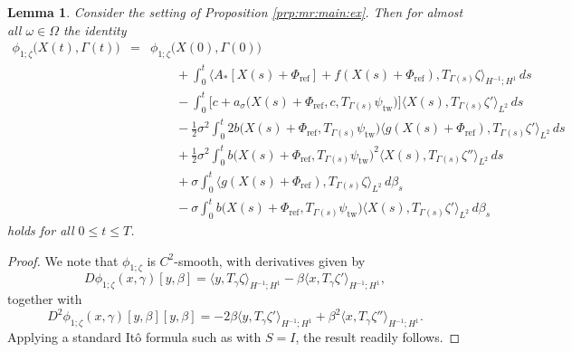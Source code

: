 \documentclass[10pt]{articleHJ}
\newtheorem{lem}[thm]{Lemma}
\numberwithin{equation}{section}
\begin{document}
\begin{lem}
Consider the setting
of Proposition
\ref{prp:mr:main:ex}.
Then for almost all $\omega \in \Omega$
the identity
\begin{equation}
\label{eq:sps:ito:i}
\begin{array}{lcl}
\phi_{1;\zeta}\big(X(t), \Gamma(t) \big)
 & = & \phi_{1;\zeta}\big( X(0), \Gamma(0) \big)
\\[0.2cm]
& & \qquad
  + \int_0^t
  \langle A_* [X(s) + \Phi_{\mathrm{ref}} ]  + f(X(s) + \Phi_{\mathrm{ref}}),
    T_{\Gamma(s)} \zeta \rangle_{H^{-1}; H^1} \, ds
\\[0.2cm]
& & \qquad
  - \int_0^t
  \big[
    c + a_{\sigma}\big( X(s) + \Phi_{\mathrm{ref}},c, T_{\Gamma(s)} \psi_{\mathrm{tw}} \big)
  \big]
    \langle X(s) , T_{\Gamma(s)} \zeta'
       \rangle_{L^2} \, d s
\\[0.2cm]
& & \qquad
- \frac{1}{2} \sigma^2
\int_0^t
2 b\big(X(s) + \Phi_{\mathrm{ref}}, T_{\Gamma(s)} \psi_{\mathrm{tw}} \big)
  \langle g(X(s) + \Phi_{\mathrm{ref}}) , T_{\Gamma(s)} \zeta' \rangle_{L^2}
  \, d s
\\[0.2cm]
& & \qquad
  + \frac{1}{2} \sigma^2 \int_0^t
     b\big(X(s) + \Phi_{\mathrm{ref}}, T_{\Gamma(s)} \psi_{\mathrm{tw}} \big)^2
   \langle X(s) , T_{\Gamma(s)} \zeta'' \rangle_{L^2}
    \, d s
\\[0.2cm]
& & \qquad
+ \sigma \int_0^t
  \langle g(X(s) + \Phi_{\mathrm{ref}}) , T_{\Gamma(s)} \zeta \rangle_{L^2} \, d \beta_s
\\[0.2cm]
& & \qquad
  - \sigma \int_0^t
   b\big( X(s) + \Phi_{\mathrm{ref}}  , T_{\Gamma(s)} \psi_{\mathrm{tw}} \big)
    \langle X(s) , T_{\Gamma(s)} \zeta'
       \rangle_{L^2} \, d \beta_s
\end{array}
\end{equation}
holds for all $0 \le t \le T$.
\end{lem}
\begin{proof}
We note that $\phi_{1;\zeta}$ is $C^2$-smooth,
with derivatives given by
\begin{equation}
D \phi_{1;\zeta}(x, \gamma)[y, \beta]
 = \langle y , T_{\gamma} \zeta \rangle_{H^{-1}; H^1}
  - \beta \langle x , T_{\gamma} \zeta'  \rangle_{H^{-1}; H^1} ,
\end{equation}
together with
\begin{equation}
D^2 \phi_{1;\zeta}(x, \gamma)[y, \beta][y, \beta]
 = -2\beta \langle y , T_{\gamma} \zeta' \rangle_{H^{-1}; H^1}
   + \beta^2 \langle x , T_{\gamma} \zeta'' \rangle_{H^{-1}; H^1} .
\end{equation}
Applying a standard It\^o formula such as
\cite[Thm. 1]{DaPratomild} with $S = I$,
the result readily follows.
\end{proof}
\end{document}
